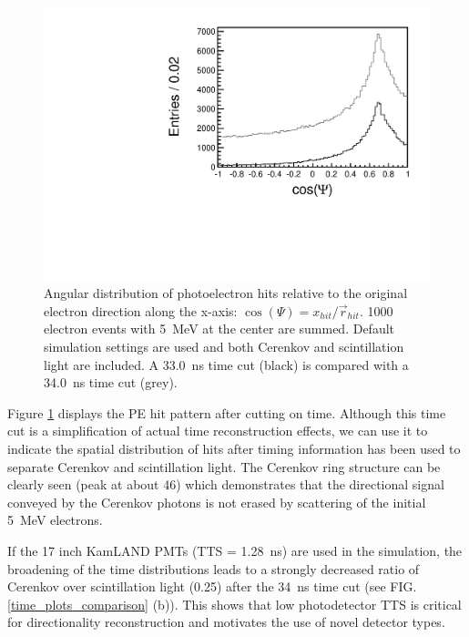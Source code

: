 \documentclass[aps,prc,twocolumn,groupedaddress,showpacs,amsmath,amssymb,floatfix,superscriptaddress]{revtex4}
\begin{document}
\begin{figure}
        \begin{center}
        \includegraphics[scale=0.40]{graphs/cos_psi_comp_h.pdf}
        \caption[]{Angular distribution of photoelectron hits relative to the original electron direction along the x-axis: $\cos(\Psi) = x_{hit}/\vec{r}_{hit}$. 1000 electron events with 5~MeV at the center are summed. Default simulation settings are used and both Cerenkov and scintillation light are included. A 33.0~ns time cut (black) is compared with a 34.0~ns time cut (grey). \label{cerenkov_cone}}
        \end{center}
\end{figure}

Figure \ref{cerenkov_cone} displays the PE hit pattern after cutting on time. Although this time cut is a simplification of actual time reconstruction effects, we can use it to indicate the spatial distribution of hits after timing information has been used to separate Cerenkov and scintillation light. The Cerenkov ring structure can be clearly seen (peak at about 46\textdegree) which demonstrates that the directional signal conveyed by the Cerenkov photons is not erased by scattering of the initial 5~MeV electrons.  

If the 17 inch KamLAND PMTs \cite{tajimaMaster,kume_1983} (TTS = 1.28~ns) are used in the simulation, the broadening of the time distributions leads to a strongly decreased ratio of Cerenkov over scintillation light (0.25) after the 34~ns time cut (see FIG. \ref{time_plots_comparison} (b)). This shows that low photodetector TTS is critical for directionality reconstruction and motivates the use of novel detector types.  
\end{document}
